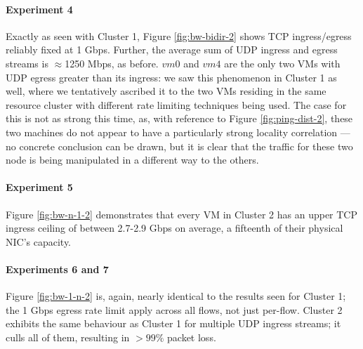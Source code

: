 \documentclass[a4paper,10pt]{article}
\begin{document}
\paragraph{Experiment 4} Exactly as seen with Cluster 1, Figure \ref{fig:bw-bidir-2} shows TCP ingress/egress reliably fixed at 1 Gbps. Further, the average sum of UDP ingress and egress streams is $\approx$1250 Mbps, as before. $vm0$ and $vm4$ are the only two VMs with UDP egress greater than its ingress: we saw this phenomenon in Cluster 1 as well, where we tentatively ascribed it to the two VMs residing in the same resource cluster with different rate limiting techniques being used. The case for this is not as strong this time, as, with reference to Figure \ref{fig:ping-dist-2}, these two machines do not appear to have a particularly strong locality correlation --- no concrete conclusion can be drawn, but it is clear that the traffic for these two node is being manipulated in a different way to the others.

\paragraph{Experiment 5} Figure \ref{fig:bw-n-1-2} demonstrates that every VM in Cluster 2 has an upper TCP ingress ceiling of between 2.7-2.9 Gbps on average, a fifteenth of their physical NIC's capacity.

\paragraph{Experiments 6 and 7} Figure \ref{fig:bw-1-n-2} is, again, nearly identical to the results seen for Cluster 1; the 1 Gbps egress rate limit apply across all flows, not just per-flow. Cluster 2 exhibits the same behaviour as Cluster 1 for multiple UDP ingress streams; it culls all of them, resulting in $\gt 99\%$ packet loss.


\clearpage
\end{document}
